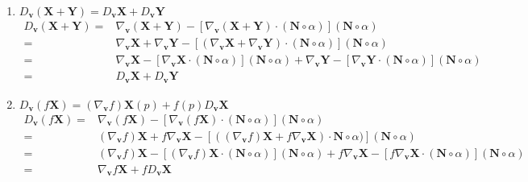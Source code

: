 \begin{enumerate}
	\item $D_{\boldsymbol{v}} (\boldsymbol{X} + \boldsymbol{Y}) = D_{\boldsymbol{v}} \boldsymbol{X} + D_{\boldsymbol{v}} \boldsymbol{Y}$
	\begin{align*}
		D_{\boldsymbol{v}} (\boldsymbol{X} + \boldsymbol{Y}) = & \nabla_{\boldsymbol{v}} (\boldsymbol{X} + \boldsymbol{Y}) - \left[ \nabla_{\boldsymbol{v}} (\boldsymbol{X}+\boldsymbol{Y}) \cdot (\boldsymbol{N} \circ \alpha) \right] (\boldsymbol{N} \circ \alpha) \\
		= & \nabla_{\boldsymbol{v}} \boldsymbol{X} + \nabla_{\boldsymbol{v}} \boldsymbol{Y} - \left[ (\nabla_{\boldsymbol{v}} \boldsymbol{X} + \nabla_{\boldsymbol{v}} \boldsymbol{Y}) \cdot (\boldsymbol{N} \circ \alpha) \right] (\boldsymbol{N} \circ \alpha) \\
		= & \nabla_{\boldsymbol{v}} \boldsymbol{X} - \left[ \nabla_{\boldsymbol{v}} \boldsymbol{X} \cdot (\boldsymbol{N} \circ \alpha) \right] (\boldsymbol{N} \circ \alpha) +  \nabla_{\boldsymbol{v}} \boldsymbol{Y} - \left[ \nabla_{\boldsymbol{v}} \boldsymbol{Y} \cdot (\boldsymbol{N} \circ \alpha) \right] (\boldsymbol{N} \circ \alpha)  \\
		= & D_{\boldsymbol{v}} \boldsymbol{X} + D_{\boldsymbol{v}} \boldsymbol{Y}
	\end{align*}
	\item $D_{\boldsymbol{v}} (f\boldsymbol{X}) = (\nabla_{\boldsymbol{v}} f)\boldsymbol{X}(p) + f(p) D_{\boldsymbol{v}} \boldsymbol{X}$ 
	\begin{align*}
		D_{\boldsymbol{v}}(f\boldsymbol{X}) = & \nabla_{\boldsymbol{v}} (f\boldsymbol{X}) - \left[ \nabla_{\boldsymbol{v}} (f\boldsymbol{X}) \cdot (\boldsymbol{N} \circ \alpha) \right] (\boldsymbol{N} \circ \alpha) \\
		= & (\nabla_{\boldsymbol{v}} f) \boldsymbol{X} + f\nabla_{\boldsymbol{v}} \boldsymbol{X} - \left[ ((\nabla_{\boldsymbol{v}} f) \boldsymbol{X} + f\nabla_{\boldsymbol{v}} \boldsymbol{X}) \cdot \boldsymbol{N} \circ \alpha) \right] (\boldsymbol{N} \circ \alpha) \\
		= & (\nabla_{\boldsymbol{v}} f) \boldsymbol{X} - \left[ (\nabla_{\boldsymbol{v}} f)\boldsymbol{X} \cdot (\boldsymbol{N} \circ \alpha) \right] (\boldsymbol{N} \circ \alpha) + f \nabla_{\boldsymbol{v}} \boldsymbol{X} - \left[ f\nabla_{\boldsymbol{v}}\boldsymbol{X} \cdot (\boldsymbol{N} \circ \alpha) \right] (\boldsymbol{N} \circ \alpha) \\
		= & \nabla_{\boldsymbol{v}} f \boldsymbol{X} + f D_{\boldsymbol{v}} \boldsymbol{X}

\end{align*}
\end{enumerate}
